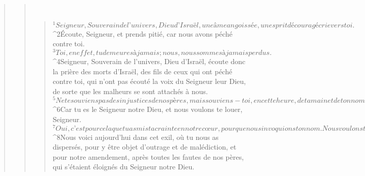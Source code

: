 \begin{verse}
\begin{verse}
         
      \bchapter{}
      \begin{verse}
${}^{1}Seigneur, Souverain de l’univers, Dieu d’Israël, une âme angoissée, un esprit découragé crie vers toi. 
${}^{2}Écoute, Seigneur, et prends pitié, car nous avons péché contre toi. 
${}^{3}Toi, en effet, tu demeures à jamais ; nous, nous sommes à jamais perdus. 
${}^{4}Seigneur, Souverain de l’univers, Dieu d’Israël, écoute donc la prière des morts d’Israël, des fils de ceux qui ont péché contre toi, qui n’ont pas écouté la voix du Seigneur leur Dieu, de sorte que les malheurs se sont attachés à nous. 
${}^{5}Ne te souviens pas des injustices de nos pères, mais souviens-toi, en cette heure, de ta main et de ton nom. 
${}^{6}Car tu es le Seigneur notre Dieu, et nous voulons te louer, Seigneur. 
${}^{7}Oui, c’est pour cela que tu as mis ta crainte en notre cœur, pour que nous invoquions ton nom. Nous voulons te louer en notre exil, puisque nous avons détourné de notre cœur toute l’injustice de nos pères qui ont péché contre toi. 
${}^{8}Nous voici aujourd’hui dans cet exil, où tu nous as dispersés, pour y être objet d’outrage et de malédiction, et pour notre amendement, après toutes les fautes de nos pères, qui s’étaient éloignés du Seigneur notre Dieu.
      

\end{verse}
\end{verse}
\end{verse}
